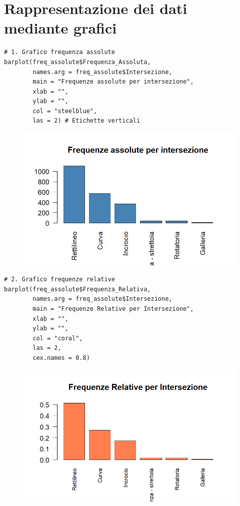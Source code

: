 \documentclass[14pt, openany, titlepage]{report} %
\begin{document}
\chapter{Rappresentazione dei dati mediante grafici}
\begin{center}
\begin{lstlisting}[breaklines=true]
# 1. Grafico frequenza assolute
barplot(freq_assolute$Frequenza_Assoluta, 
        names.arg = freq_assolute$Intersezione,
        main = "Frequenze assolute per intersezione",
        xlab = "",
        ylab = "",
        col = "steelblue",
        las = 2) # Etichette verticali
\end{lstlisting}  
\end{center}

\begin{figure}[H] %
    \centering
    \includegraphics[width=12cm, height=7cm]{Rplot.png} %
\end{figure}

\begin{center}
\begin{lstlisting}[breaklines=true]
# 2. Grafico frequenze relative
barplot(freq_assolute$Frequenza_Relativa, 
        names.arg = freq_assolute$Intersezione,
        main = "Frequenze Relative per Intersezione",
        xlab = "",
        ylab = "",
        col = "coral",
        las = 2,
        cex.names = 0.8)
\end{lstlisting}  
\end{center}

\begin{figure}[H] %
    \centering
    \includegraphics[width=12cm, height=7cm]{Rplot03.png} %
\end{figure}
\end{document}
